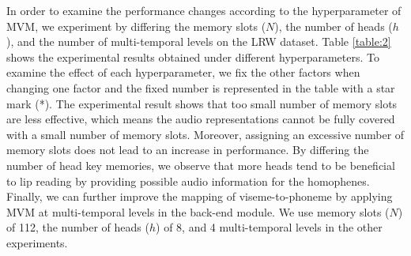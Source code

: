 \documentclass[letterpaper]{article} \usepackage{aaai22}  \usepackage{times}  \usepackage{helvet}  \usepackage{courier}  \usepackage[hyphens]{url}  \usepackage{graphicx} \urlstyle{rm} \def\UrlFont{\rm}  \usepackage{natbib}  \usepackage{caption} \DeclareCaptionStyle{ruled}{labelfont=normalfont,labelsep=colon,strut=off} \frenchspacing  \setlength{\pdfpagewidth}{8.5in}  \setlength{\pdfpageheight}{11in}  \usepackage{algorithm}
\begin{document}
\begin{table}[t!]
\renewcommand{\arraystretch}{1.4}
\caption{Word accuracy comparison on LRW. 
}
\label{table:3}
\end{table}

In order to examine the performance changes according to the hyperparameter of MVM, we experiment by differing the memory slots ($N$), the number of heads ($h$), and the number of multi-temporal levels on the LRW dataset. Table \ref{table:2} shows the experimental results obtained under different hyperparameters. To examine the effect of each hyperparameter, we fix the other factors when changing one factor and the fixed number is represented in the table with a star mark (*). The experimental result shows that too small number of memory slots are less effective, which means the audio representations cannot be fully covered with a small number of memory slots. Moreover, assigning an excessive number of memory slots does not lead to an increase in performance. By differing the number of head key memories, we observe that more heads tend to be beneficial to lip reading by providing possible audio information for the homophenes. Finally, we can further improve the mapping of viseme-to-phoneme by applying MVM at multi-temporal levels in the back-end module. We use memory slots ($N$) of 112, the number of heads ($h$) of 8, and 4 multi-temporal levels in the other experiments.
\end{document}
